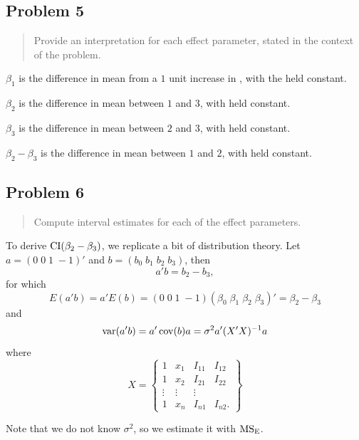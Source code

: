\documentclass[
]{article}
\begin{document}
\hypertarget{problem-5}{%
\subsection{Problem 5}\label{problem-5}}

\begin{quote}
Provide an interpretation for each effect parameter, stated in the
context of the problem.
\end{quote}

\(\beta_1\) is the difference in mean  from a \(1\) unit
increase in , with the  held constant.

\(\beta_2\) is the difference in mean  between 
\(1\) and  \(3\), with  held constant.

\(\beta_3\) is the difference in mean  between 
\(2\) and  \(3\), with  held constant.

\(\beta_2-\beta_3\) is the difference in mean  between
 \(1\) and  \(2\), with  held
constant.

\hypertarget{problem-6}{%
\subsection{Problem 6}\label{problem-6}}

\begin{quote}
Compute interval estimates for each of the effect parameters.
\end{quote}

To derive \(\operatorname{CI}(\beta_2 - \beta_3)\), we replicate a bit of distribution
theory. Let \(a = (0\;0\;1\;-1)'\) and \(b = (b_0\;b_1\;b_2\;b_3)\),
then \[
  a' b = b_2 - b_3,
\] for which \[
  E(a' b) = a' E(b) = (0\;0\;1\;-1) (\beta_0\;\beta_1\;\beta_2\;\beta_3)' = \beta_2 - \beta_3
\] and \[
  \operatorname{var}(a' b) = a' \operatorname{cov}(b) a = \sigma^2 a' (X'X)^{-1} a
\] where \[
  X =
  \begin{Bmatrix}
    1 & x_1 & I_{1 1} & I_{1 2}\\
    1 & x_2 & I_{2 1} & I_{2 2}\\
    \vdots & \vdots & \vdots\\
    1 & x_n & I_{n 1} & I_{n 2}.
  \end{Bmatrix}
\]

Note that we do not know \(\sigma^2\), so we estimate it with
\(\mathrm{MS_{E}}\).
\end{document}
